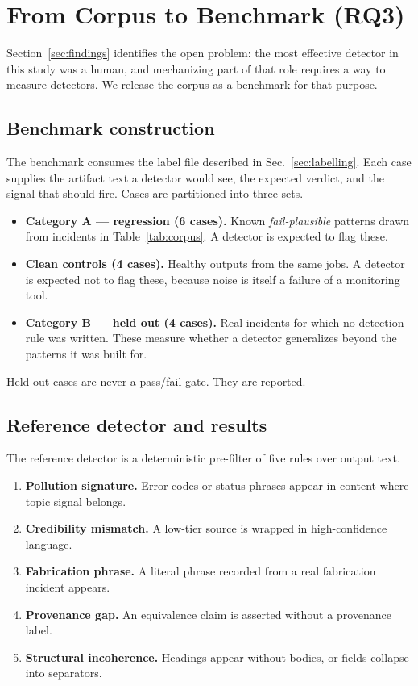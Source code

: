 \documentclass[conference]{IEEEtran}
\newcommand{\failplausible}{\emph{fail-plausible}}
\begin{document}
\section{From Corpus to Benchmark (RQ3)}
\label{sec:bench}

Section~\ref{sec:findings} identifies the open problem: the most effective
detector in this study was a human, and mechanizing part of that role
requires a way to measure detectors. We release the corpus as a benchmark
for that purpose.

\subsection{Benchmark construction}

The benchmark consumes the label file described in
Sec.~\ref{sec:labelling}. Each case supplies the artifact text a detector
would see, the expected verdict, and the signal that should fire. Cases are
partitioned into three sets.

\begin{itemize}
  \item \textbf{Category A --- regression (6 cases).} Known \failplausible{}
        patterns drawn from incidents in Table~\ref{tab:corpus}. A detector
        is expected to flag these.
  \item \textbf{Clean controls (4 cases).} Healthy outputs from the same
        jobs. A detector is expected not to flag these, because noise is
        itself a failure of a monitoring tool.
  \item \textbf{Category B --- held out (4 cases).} Real incidents for which
        no detection rule was written. These measure whether a detector
        generalizes beyond the patterns it was built for.
\end{itemize}

Held-out cases are never a pass/fail gate. They are reported.

\subsection{Reference detector and results}

The reference detector is a deterministic pre-filter of five rules over
output text.

\begin{enumerate}
  \item \textbf{Pollution signature.} Error codes or status phrases appear
        in content where topic signal belongs.
  \item \textbf{Credibility mismatch.} A low-tier source is wrapped in
        high-confidence language.
  \item \textbf{Fabrication phrase.} A literal phrase recorded from a real
        fabrication incident appears.
  \item \textbf{Provenance gap.} An equivalence claim is asserted without a
        provenance label.
  \item \textbf{Structural incoherence.} Headings appear without bodies, or
        fields collapse into separators.
\end{enumerate}
\end{document}
